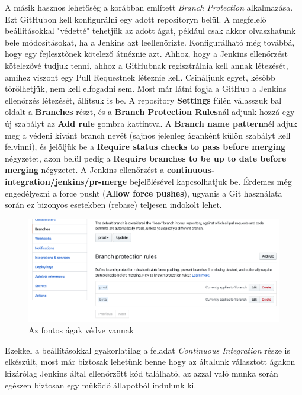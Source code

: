 A másik hasznos lehetőség a korábban említett \textit{Branch Protection} alkalmazása. Ezt GitHubon kell konfigurálni egy adott repositoryn belül. A megfelelő beállításokkal "védetté" tehetjük az adott ágat, például csak akkor olvaszhatunk bele módosításokat, ha a Jenkins azt leellenőrizte. Konfigurálható még továbbá, hogy egy fejlesztőnek kötelező átnéznie azt. Ahhoz, hogy a Jenkins ellenőrzést kötelezővé tudjuk tenni, ahhoz a GitHubnak regisztrálnia kell annak létezését, amihez viszont egy Pull Requestnek léteznie kell. Csináljunk egyet, később törölhetjük, nem kell elfogadni sem. Most már látni fogja a GitHub a Jenkins ellenőrzés létezését, állítsuk is be. A repository \textbf{Settings} fülén válasszuk bal oldalt a \textbf{Branches} részt, és a \textbf{Branch Protection Rules}nál adjunk hozzá egy új szabályt az \textbf{Add rule} gombra kattintva. A \textbf{Branch name pattern}nél adjuk meg a védeni kívánt branch nevét (sajnos jelenleg áganként külön szabályt kell felvinni), és jelöljük be a \textbf{Require status checks to pass before merging} négyzetet, azon belül pedig a \textbf{Require branches to be up to date before merging} négyzetet. A Jenkins ellenőrzést a \textbf{continuous-integration/jenkins/pr-merge} bejelölésével kapcsolhatjuk be. Érdemes még engedélyezni a force pusht (\textbf{Allow force pushes}), ugyanis a Git használata során ez bizonyos esetekben (rebase) teljesen indokolt lehet.
\begin{figure}[ht]
\centering
\includegraphics[width=150mm, keepaspectratio]{img/gitbranch.png}
\caption{Az fontos ágak védve vannak}
\end{figure}

Ezekkel a beállításokkal gyakorlatilag a feladat \textit{Continuous Integration} része is elkészült, most már biztosak lehetünk benne hogy az általunk választott ágakon kizárólag Jenkins által ellenőrzött kód található, az azzal való munka során egészen biztosan egy működő állapotból indulunk ki.
\newpage
